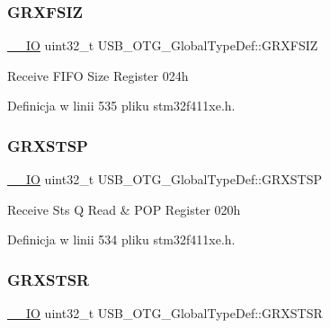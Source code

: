 \subsubsection{\texorpdfstring{G\+R\+X\+F\+S\+IZ}{GRXFSIZ}}
{\footnotesize\ttfamily \hyperlink{core__sc300_8h_aec43007d9998a0a0e01faede4133d6be}{\+\_\+\+\_\+\+IO} uint32\+\_\+t U\+S\+B\+\_\+\+O\+T\+G\+\_\+\+Global\+Type\+Def\+::\+G\+R\+X\+F\+S\+IZ}

Receive F\+I\+FO Size Register 024h 

Definicja w linii 535 pliku stm32f411xe.\+h.

\mbox{\label{struct_u_s_b___o_t_g___global_type_def_a060364111cf507dfab9bb6503477983a}} 
\subsubsection{\texorpdfstring{G\+R\+X\+S\+T\+SP}{GRXSTSP}}
{\footnotesize\ttfamily \hyperlink{core__sc300_8h_aec43007d9998a0a0e01faede4133d6be}{\+\_\+\+\_\+\+IO} uint32\+\_\+t U\+S\+B\+\_\+\+O\+T\+G\+\_\+\+Global\+Type\+Def\+::\+G\+R\+X\+S\+T\+SP}

Receive Sts Q Read \& P\+OP Register 020h 

Definicja w linii 534 pliku stm32f411xe.\+h.

\mbox{\label{struct_u_s_b___o_t_g___global_type_def_a77b651a1120fc5fb647eaccac6f002c6}} 
\subsubsection{\texorpdfstring{G\+R\+X\+S\+T\+SR}{GRXSTSR}}
{\footnotesize\ttfamily \hyperlink{core__sc300_8h_aec43007d9998a0a0e01faede4133d6be}{\+\_\+\+\_\+\+IO} uint32\+\_\+t U\+S\+B\+\_\+\+O\+T\+G\+\_\+\+Global\+Type\+Def\+::\+G\+R\+X\+S\+T\+SR}

